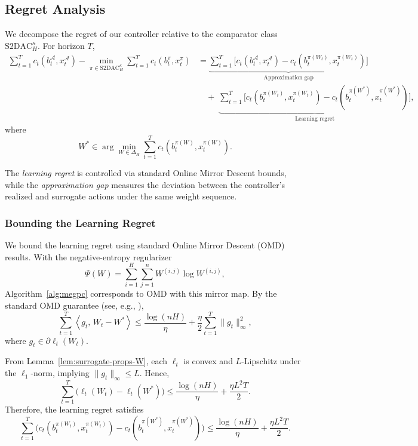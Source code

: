 \documentclass[11pt]{article}
\begin{document}
\subsection{Regret Analysis}

We decompose the regret of our controller relative to the comparator class \(\mathrm{S2DAC}_H^\kappa\).  
For horizon \(T\),
\begin{align*}
\sum_{t=1}^T c_t(b_t^\mathcal{A},x_t^\mathcal{A})
- \min_{\pi\in\mathrm{S2DAC}_H^\kappa} \sum_{t=1}^T c_t(b_t^\pi,x_t^\pi)
&=
\underbrace{\sum_{t=1}^T \big[ c_t(b_t^\mathcal{A},x_t^\mathcal{A}) - c_t(b_t^{\pi(W_t)},x_t^{\pi(W_t)}) \big]}_{\text{Approximation gap}} \\
&\quad+\;
\underbrace{\sum_{t=1}^T \big[ c_t(b_t^{\pi(W_t)},x_t^{\pi(W_t)}) - c_t(b_t^{\pi(W^*)},x_t^{\pi(W^*)}) \big]}_{\text{Learning regret}},
\end{align*}
where
\[
W^* \in \arg\min_{W\in\Delta_H} \sum_{t=1}^T c_t(b_t^{\pi(W)},x_t^{\pi(W)}).
\]

The \textit{learning regret} is controlled via standard Online Mirror Descent bounds, while the \textit{approximation gap} measures the deviation between the controller’s realized and surrogate actions under the same weight sequence.

\subsubsection{Bounding the Learning Regret}

We bound the learning regret using standard Online Mirror Descent (OMD) results.  
With the negative-entropy regularizer
\[
\Psi(W) = \sum_{i=1}^H \sum_{j=1}^n W^{(i,j)} \log W^{(i,j)},
\]
Algorithm~\ref{alg:megpc} corresponds to OMD with this mirror map. By the standard OMD guarantee (see, e.g., \cite{orabona_modern_2023}),
\[
\sum_{t=1}^T 
\left\langle g_t,\, W_t - W^* \right\rangle
\le
\frac{\log(nH)}{\eta}
+ \frac{\eta}{2}\sum_{t=1}^T \|g_t\|_\infty^2,
\]
where \(g_t \in \partial \ell_t(W_t)\).

From Lemma~\ref{lem:surrogate-props-W}, each \(\ell_t\) is convex and \(L\)-Lipschitz under the \(\ell_1\)-norm, implying \(\|g_t\|_\infty \le L\).  
Hence,
\[
\sum_{t=1}^T \bigl(\ell_t(W_t) - \ell_t(W^*)\bigr)
\le
\frac{\log(nH)}{\eta}
+ \frac{\eta L^2 T}{2}.
\]
Therefore, the learning regret satisfies
\begin{equation}
\label{eq:omd-W}
\sum_{t=1}^T 
\Big(
c_t(b_t^{\pi(W_t)},x_t^{\pi(W_t)})
-
c_t(b_t^{\pi(W^*)},x_t^{\pi(W^*)})
\Big)
\le
\frac{\log(nH)}{\eta}
+ \frac{\eta L^2 T}{2}.
\end{equation}
\end{document}
